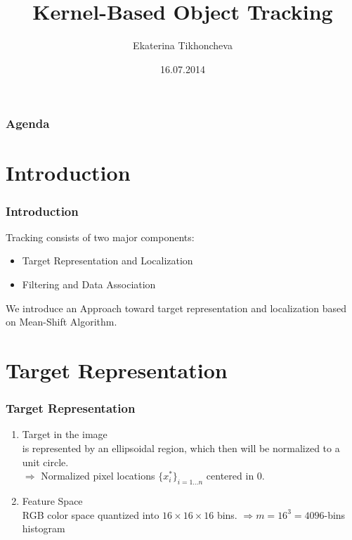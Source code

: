 \documentclass[hyperref={pdfpagelabels=false}]{beamer}
\title{Kernel-Based Object Tracking}
\author{Ekaterina Tikhoncheva}
\date{16.07.2014}
\newcounter{saveenumi}
\newcommand{\seti}{\setcounter{saveenumi}{\value{enumi}}}
\begin{document}
\begin{frame}
\titlepage
\end{frame}
\begin{frame}
\frametitle{Agenda}
\tableofcontents
\end{frame} 


\section{Introduction}
\begin{frame}
\frametitle{Introduction}
Tracking consists of two major components:
\begin{itemize}
\item Target Representation and Localization
\item Filtering and Data Association
\end{itemize}

We introduce an Approach toward target representation and localization based on 
{\color{darkred} Mean-Shift Algorithm}\cite{KernelBasedObjectTracking}.


\end{frame}
\section{Target Representation}
\begin{frame}
\frametitle{Target Representation}
\begin{enumerate}
\item Target in the image \\
	is represented by an {\color{darkred} ellipsoidal region}, which then
	will be normalized to a {\color{darkred} unit circle}.
	\\ $\Rightarrow$ Normalized pixel locations $\{x^{*}_i\}_{i=1\dots n}$ centered in $0$.
\item Feature Space \\
	{\color{darkred} RGB color space} quantized into $16\times 16\times 16$ bins.
	$\Rightarrow m= 16^3 = 4096$-bins histogram
\end{enumerate}

\seti
\end{frame}
\end{document}
